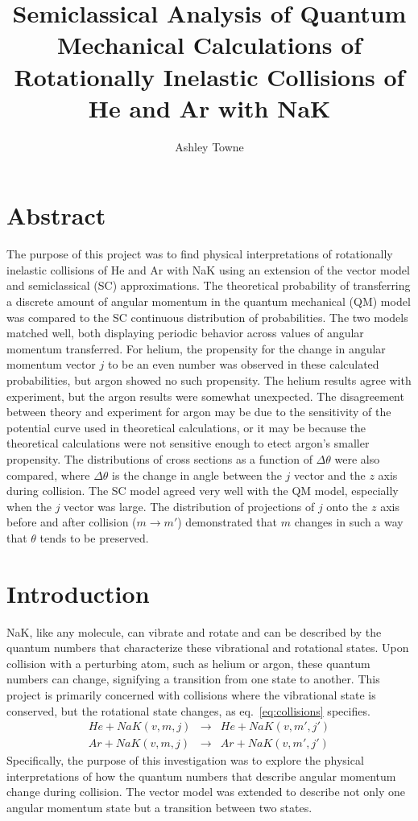 \documentclass[letterpaper,titlepage,12pt]{article}
\author{Ashley Towne}
\title{Semiclassical Analysis of Quantum Mechanical Calculations of Rotationally
Inelastic Collisions of He and Ar with NaK}
\begin{document}
\maketitle
\tableofcontents

\clearpage
\section{Abstract}
The purpose of this project was to find physical interpretations of
rotationally inelastic collisions of He and Ar with NaK using an extension of
the vector model and semiclassical (SC) approximations.  The theoretical
probability of transferring a discrete amount of angular momentum in the
quantum mechanical (QM) model was compared to the SC continuous distribution of
probabilities.  The two models matched well, both displaying periodic behavior
across values of angular momentum transferred.  For helium, the propensity for
the change in angular momentum vector $j$ to be an even number was observed in
these calculated probabilities, but argon showed no such propensity.  The
helium results agree with experiment, but the argon results were somewhat
unexpected.  The disagreement between theory and experiment for argon may be
due to the sensitivity of the potential curve used in theoretical calculations,
or it may be because the theoretical calculations were not sensitive enough to
etect argon's smaller propensity.  The distributions of cross sections as a
function of $\Delta\theta$ were also compared, where $\Delta\theta$ is the
change in angle between the $j$ vector and the $z$ axis during collision.  The
SC model agreed very well with the QM model, especially when the $j$ vector was
large.  The distribution of projections of $j$ onto the $z$ axis before and
after collision ($m\rightarrow m'$) demonstrated that $m$ changes in such a way
that $\theta$ tends to be preserved.

\clearpage
\section{Introduction}
NaK, like any molecule, can vibrate and rotate and can be described by the
quantum numbers that characterize these vibrational and rotational states.
Upon collision with a perturbing atom, such as helium or argon, these quantum
numbers can change, signifying a transition from one state to another.  This
project is primarily concerned with collisions where the vibrational state is
conserved, but the rotational state changes, as eq.~\ref{eq:collisions}
specifies.  
\begin{eqnarray}
    He+NaK(v,m,j)&\rightarrow& He+NaK(v,m',j') \nonumber\\
    Ar+NaK(v,m,j)&\rightarrow& Ar+NaK(v,m',j')
    \label{eq:collisions}
\end{eqnarray}
Specifically, the purpose of this investigation was to explore the physical
interpretations of how the quantum numbers that describe angular momentum
change during collision.  The vector model was extended to describe not only
one angular momentum state but a transition between two states.
\end{document}
